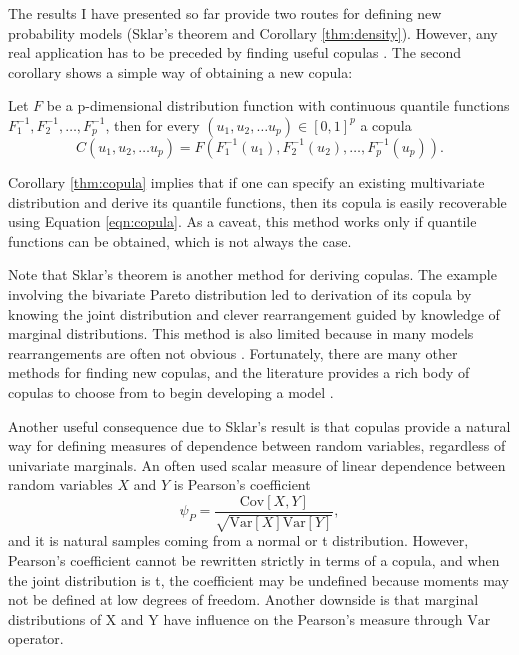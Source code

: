 \documentclass[12pt]{article}
\begin{document}
The results I have presented so far provide two routes for
defining new probability models (Sklar's theorem and Corollary \ref{thm:density}). However, any real application has
to be preceded by finding useful copulas \citep{Joe1997,Nel2007}. The
second corollary shows a simple way of obtaining a new copula:
%
\begin{cors}
\label{thm:copula}
Let $F$ be a p-dimensional distribution function with continuous
quantile functions $F_1^{-1}, F_2^{-1}, \dots, F_p^{-1}$, then for
every $(u_1, u_2, \dots u_p) \in [0, 1]^p$ a copula
%
\begin{equation}
\label{eqn:copula}
C(u_1, u_2, \dots u_p) = F(F_1^{-1}(u_1), F_2^{-1}(u_2), \dots, F_p^{-1}(u_p)).
\end{equation}
%
\end{cors}
%

Corollary \ref{thm:copula} implies that if one can specify an
existing multivariate distribution and derive its quantile functions,
then its copula is easily recoverable using
Equation \ref{eqn:copula}.  As a caveat, this method works
only if quantile functions can be obtained, which is not always
the case. 

Note that Sklar's theorem is another method for deriving copulas. The example involving the bivariate Pareto distribution led to derivation of its copula by knowing the joint distribution and clever rearrangement guided by knowledge of marginal distributions. This method is also limited because in many models rearrangements are often not obvious \citep{FreVal1998}. Fortunately, there are many other methods for finding new copulas, and the
literature provides a rich body of copulas to choose from to begin developing a model
\citep{Joe1997,Nel2007}.

Another useful consequence due to Sklar's result is that copulas provide a natural way for defining measures of dependence between random variables, regardless of univariate marginals. An often used scalar measure of linear dependence between random variables $X$ and $Y$ is Pearson's coefficient
\begin{equation}
\psi_P = \frac{\mathrm{Cov}\left[X, Y\right]}{\sqrt{\mathrm{Var}\left[X\right]\mathrm{Var}\left[Y\right]}},
\end{equation}
and it is natural samples coming from a normal or t distribution. However, Pearson's coefficient cannot be rewritten strictly in terms of a copula, and when the joint distribution is t, the coefficient may be undefined because moments may not be defined at low degrees of freedom. Another downside is that marginal distributions of X and Y have influence on the Pearson's measure through $\mathrm{Var}$ operator.
\end{document}
